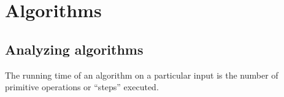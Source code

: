 \section{Algorithms}

\subsection{Analyzing algorithms}
\begin{definition}
    The running time of an algorithm on a particular input is the number of primitive operations or ``steps'' executed.
\end{definition}

\begin{definition}
\end{definition}
